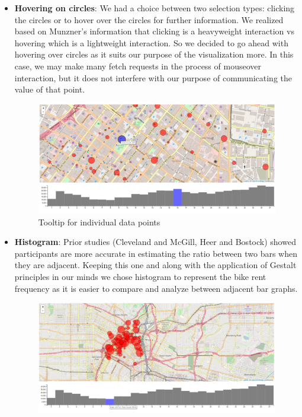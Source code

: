\begin{itemize}
	\item \textbf{Hovering on circles}: We had a choice between two selection types: clicking the circles or to hover over the circles for further information. We realized based on Munzner's information that clicking is a heavyweight interaction vs hovering which is a lightweight interaction. So we decided to go ahead with hovering over circles as it suits our purpose of the visualization more. In this case, we may make many fetch requests in the process of mouseover interaction, but it does not interfere with our purpose of communicating the value of that point.
	\begin{figure}[h]
		\centering %
		\includegraphics[scale=0.20]{figs/zoom_2.png}
		\caption{\footnotesize{Tooltip for individual data points}}
		\label{fig:First viz Chart}
		\captionsetup{justification=centering,margin=1cm}
		\vspace{-10pt}
	\end{figure}
	\item \textbf{Histogram}: Prior studies (Cleveland and McGill, Heer and Bostock) showed participants are more accurate in estimating the ratio between two bars when they are adjacent. Keeping this one and along with the application of Gestalt principles in our minds we chose histogram to represent the bike rent frequency as it is easier to compare and analyze between adjacent bar graphs.
		\begin{figure}[h]
		\centering %
		\includegraphics[scale=0.20]{figs/zoom.png}

\end{figure}
\end{itemize}
